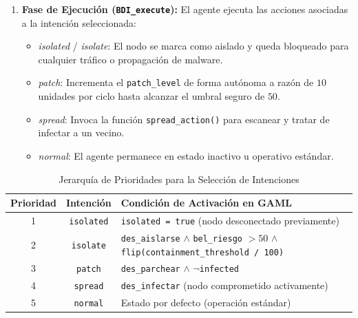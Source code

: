 \begin{enumerate}
    \item \textbf{Fase de Ejecución (\texttt{BDI\_}\allowbreak\texttt{execute}):} El agente ejecuta las acciones asociadas a la intención seleccionada:
    \begin{itemize}
        \item \textit{isolated} / \textit{isolate}: El nodo se marca como aislado y queda bloqueado para cualquier tráfico o propagación de malware.
        \item \textit{patch}: Incrementa el \texttt{patch\_}\allowbreak\texttt{level} de forma autónoma a razón de $10$ unidades por ciclo hasta alcanzar el umbral seguro de $50$.
        \item \textit{spread}: Invoca la función \texttt{spread\_}\allowbreak\texttt{action()} para escanear y tratar de infectar a un vecino.
        \item \textit{normal}: El agente permanece en estado inactivo u operativo estándar.
    \end{itemize}
\end{enumerate}

\begin{table}[htbp]
\caption{Jerarquía de Prioridades para la Selección de Intenciones}
\label{tab:prioridades_bdi}
\begin{center}
\footnotesize
\begin{tabular}{|c|c|p{}|}
\hline
\textbf{Prioridad} & \textbf{Intención} & \textbf{Condición de Activación en GAML} \\ \hline
1 & \texttt{isolated} & \texttt{isolated = true} \newline (nodo desconectado previamente) \\ \hline
2 & \texttt{isolate} & \texttt{des\_aislarse} $\land$ \texttt{bel\_riesgo} $> 50$ $\land$ \newline \texttt{flip(containment\_threshold / 100)} \\ \hline
3 & \texttt{patch} & \texttt{des\_parchear} $\land$ $\neg$\texttt{infected} \\ \hline
4 & \texttt{spread} & \texttt{des\_infectar} \newline (nodo comprometido activamente) \\ \hline
5 & \texttt{normal} & Estado por defecto (operación estándar) \\ \hline
\end{tabular}
\end{center}
\end{table}

